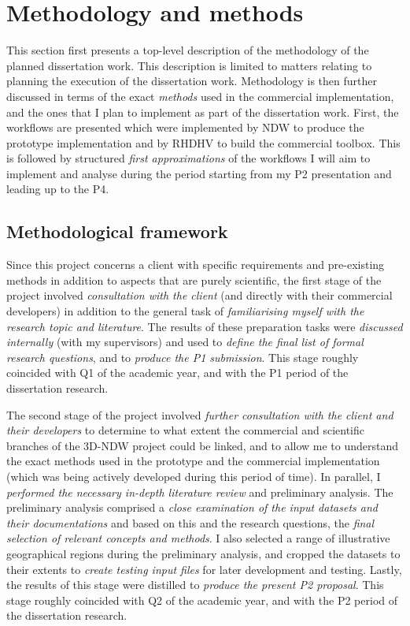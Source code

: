 \chapter{Methodology and methods}
\label{chap:mm}

This section first presents a top-level description of the methodology of the planned dissertation work. This description is limited to matters relating to planning the execution of the dissertation work. Methodology is then further discussed in terms of the exact \textit{methods} used in the commercial implementation, and the ones that I plan to implement as part of the dissertation work. First, the workflows are presented which were implemented by NDW to produce the prototype implementation and by RHDHV to build the commercial toolbox. This is followed by structured \textit{first approximations} of the workflows I will aim to implement and analyse during the period starting from my P2 presentation and leading up to the P4.

\section{Methodological framework}
\label{sec:methodology}

Since this project concerns a client with specific requirements and pre-existing methods in addition to aspects that are purely scientific, the first stage of the project involved \textit{consultation with the client} (and directly with their commercial developers) in addition to the general task of \textit{familiarising myself with the research topic and literature}. The results of these preparation tasks were \textit{discussed internally} (with my supervisors) and used to \textit{define the final list of formal research questions}, and to \textit{produce the P1 submission}. This stage roughly coincided with Q1 of the academic year, and with the P1 period of the dissertation research.

The second stage of the project involved \textit{further consultation with the client and their developers} to determine to what extent the commercial and scientific branches of the 3D-NDW project could be linked, and to allow me to understand the exact methods used in the prototype and the commercial implementation (which was being actively developed during this period of time). In parallel, I \textit{performed the necessary in-depth literature review} and preliminary analysis. The preliminary analysis comprised a \textit{close examination of the input datasets and their documentations} and based on this and the research questions, the \textit{final selection of relevant concepts and methods}. I also selected a range of illustrative geographical regions during the preliminary analysis, and cropped the datasets to their extents to \textit{create testing input files} for later development and testing. Lastly, the results of this stage were distilled to \textit{produce the present P2 proposal}. This stage roughly coincided with Q2 of the academic year, and with the P2 period of the dissertation research.

